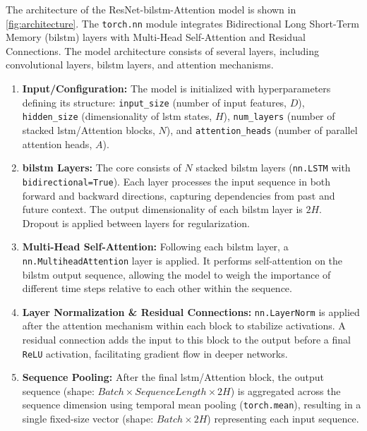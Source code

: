 The architecture of the ResNet-\gls{bilstm}-Attention model is shown in \autoref{fig:architecture}. The \texttt{torch.nn} module integrates Bidirectional Long Short-Term Memory (\gls{bilstm}) layers with Multi-Head Self-Attention and Residual Connections. The model architecture consists of several layers, including convolutional layers, \gls{bilstm} layers, and attention mechanisms.

\begin{enumerate}
  \item \textbf{Input/Configuration:} The model is initialized with hyperparameters defining its structure: \texttt{input\_size} (number of input features, $D$), \texttt{hidden\_size} (dimensionality of \gls{lstm} states, $H$), \texttt{num\_layers} (number of stacked \gls{lstm}/Attention blocks, $N$), and \texttt{attention\_heads} (number of parallel attention heads, $A$).

  \item \textbf{\gls{bilstm} Layers:} The core consists of $N$ stacked \gls{bilstm} layers (\texttt{nn.LSTM} with \texttt{bidirectional=True}). Each layer processes the input sequence in both forward and backward directions, capturing dependencies from past and future context. The output dimensionality of each \gls{bilstm} layer is $2H$. Dropout is applied between layers for regularization.

  \item \textbf{Multi-Head Self-Attention:} Following each \gls{bilstm} layer, a \texttt{nn.MultiheadAttention} layer is applied. It performs self-attention on the \gls{bilstm} output sequence, allowing the model to weigh the importance of different time steps relative to each other within the sequence.

  \item \textbf{Layer Normalization \& Residual Connections:} \texttt{nn.LayerNorm} is applied after the attention mechanism within each block to stabilize activations. A residual connection adds the input to this block to the output before a final \texttt{ReLU} activation, facilitating gradient flow in deeper networks.

  \item \textbf{Sequence Pooling:} After the final \gls{lstm}/Attention block, the output sequence (shape: $Batch \times Sequence Length \times 2H$) is aggregated across the sequence dimension using temporal mean pooling (\texttt{torch.mean}), resulting in a single fixed-size vector (shape: $Batch \times 2H$) representing each input sequence.


\end{enumerate}
